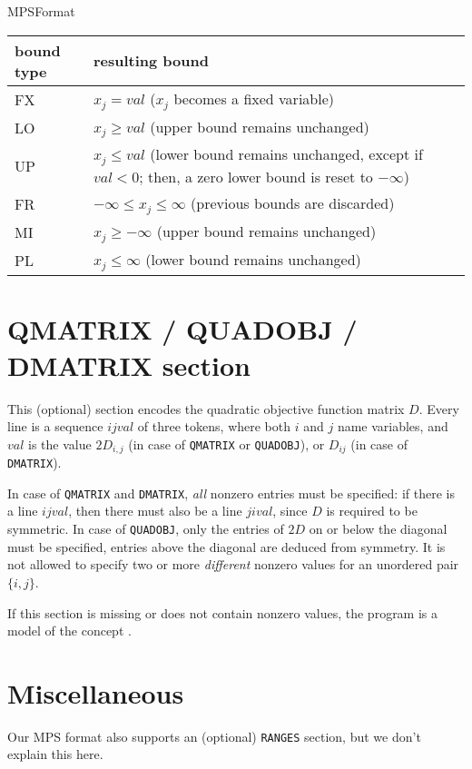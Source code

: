 \begin{ccRefConcept}{MPSFormat}
\begin{tabular}{l|l}
bound type & resulting bound \\ \hline
FX & $x_j = val$ ($x_j$ becomes a fixed variable) \\
LO & $x_j \geq val$ (upper bound remains unchanged) \\
UP & $x_j \leq val$ (lower bound remains unchanged, except if $val<0$; then, 
a zero lower bound is reset to $-\infty$)\\
FR & $-\infty \leq x_j\leq\infty$ (previous bounds are discarded)\\
MI & $x_j\geq -\infty$ (upper bound remains unchanged)\\
PL & $x_j\leq \infty$ (lower bound remains unchanged)    
\end{tabular}

\section*{QMATRIX / QUADOBJ / DMATRIX section}
This (optional) section encodes the quadratic objective
function matrix $D$. Every line is a sequence $i j val$ of
three tokens, where both $i$ and $j$ name variables, and
$val$ is the value $2D_{i,j}$ (in case of \texttt{QMATRIX}
or \texttt{QUADOBJ}), or $D_{ij}$ (in case of \texttt{DMATRIX}).

In case of \texttt{QMATRIX} and \texttt{DMATRIX}, \emph{all} nonzero
entries must be specified: if there is a line $i j val$, then there
must also be a line $j i val$, since $D$ is required to be symmetric.
In case of \texttt{QUADOBJ}, only the entries of $2D$ on or below the 
diagonal must be specified, entries above the diagonal are deduced from 
symmetry. It is not allowed to specify two or more \emph{different} 
nonzero values for an unordered pair $\{i,j\}$.

If this section is missing or does not contain nonzero values, the
program is a model of the concept .

\section*{Miscellaneous}
Our MPS format also supports an (optional) \texttt{RANGES} section,
but we don't explain this here.

\ccSeeAlso


\end{ccRefConcept}
